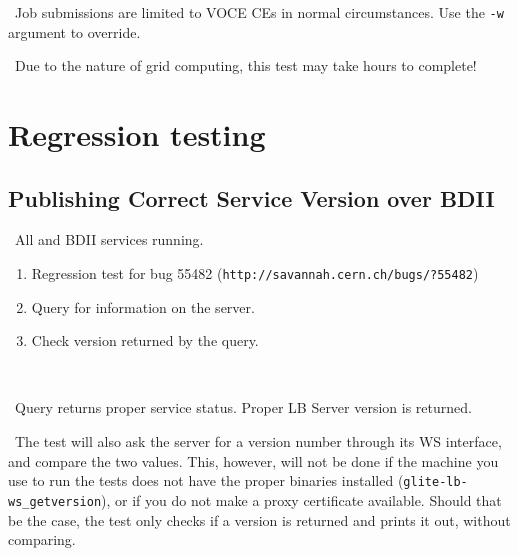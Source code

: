 \note\ Job submissions are limited to VOCE CEs in normal circumstances. Use the \texttt{-w} argument to override. 

\note\ Due to the nature of grid computing, this test may take hours to complete!  



\section{Regression testing}

\subsection{Publishing Correct Service Version over BDII}
\req\ All \LB and BDII services running.

\what
\begin{enumerate}
\item Regression test for bug 55482 (\texttt{http://savannah.cern.ch/bugs/?55482})
\item Query for information on the server.
\item Check version returned by the query.
\end{enumerate}

\how\ 

\result\ Query returns proper service status. Proper LB Server version is returned.

\note\ The test will also ask the \LB server for a version number through its WS interface, and compare the two values. This, however, will not be done if the machine you use to run the tests does not have the proper binaries installed (\texttt{glite-lb-ws\_getversion}), or if you do not make a proxy certificate available. Should that be the case, the test only checks if a version is returned and prints it out, without comparing.

